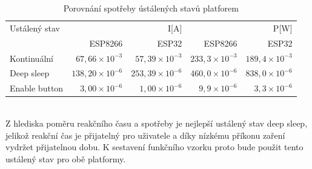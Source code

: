\documentclass[a4paper, 12pt]{report}
\begin{document}
    \begin{table}[h!]
        \centering
        \caption{Porovnání spotřeby ústálených stavů platforem}
        \begin{tabular}{||l|r r|r r||}
            \hline
            Ustálený stav & \multicolumn{2}{C|}{I[A]} & \multicolumn{2}{C||}{P[W]}   \\
                          & ESP8266        & ESP32   & ESP8266 & ESP32 \\
            \hline
            Kontinuální   & $67,66 \times 10^{-3}$   & $57,39 \times 10^{-3}$ & $233,3 \times 10^{-3}$& $189,4 \times 10^{-3}$ \\
            Deep sleep       & $138,20 \times 10^{-6}$ & $253,39 \times 10^{-6}$ & $460,0 \times 10^{-6}$&$838,0 \times 10^{-6}$\\
            Enable button    &  $3,00 \times 10^{-6}$   & $1,00 \times 10^{-6}$ & $9,9 \times 10^{-6}$&$3,3 \times 10^{-6}$\\
            \hline
        \end{tabular}
        \label{tab:porovnani-klidove-rezimy-spotreba}
    \end{table}\\ \pagebreak
    Z hlediska poměru reakčního času a spotřeby je nejlepší ustálený stav deep sleep, jelikož reakční čas je přijatelný pro uživatele a díky nízkému příkonu zaření vydržet přijatelnou dobu. K sestavení funkčního vzorku proto bude použit tento ustálený stav pro obě platformy.
\end{document}
